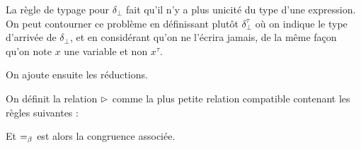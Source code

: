 \begin{rmk}
    La règle de typage pour $\delta_\bot$ fait qu'il n'y a plus unicité du type d'une expression. On peut contourner ce problème en définissant plutôt $\delta_\bot^\tau$ où on indique le type d'arrivée de $\delta_\bot$, et en considérant qu'on ne l'écrira jamais, de la même façon qu'on note $x$ une variable et non $x^\tau$.
\end{rmk}

On ajoute ensuite les réductions.

\begin{defi}
    On définit la relation $\reduc$ comme la plus petite relation compatible contenant les règles suivantes :
    \begin{center}
        \begin{prooftree}
        \end{prooftree}
        \qquad
        \begin{prooftree}
        \end{prooftree}
        \qquad
        \begin{prooftree}
        \end{prooftree}

        \vspace{0.5cm}
        
        \begin{prooftree}
        \end{prooftree}
        \qquad
        \begin{prooftree}
        \end{prooftree}
    \end{center}

    Et $\beteq$ est alors la congruence associée.
\end{defi}

